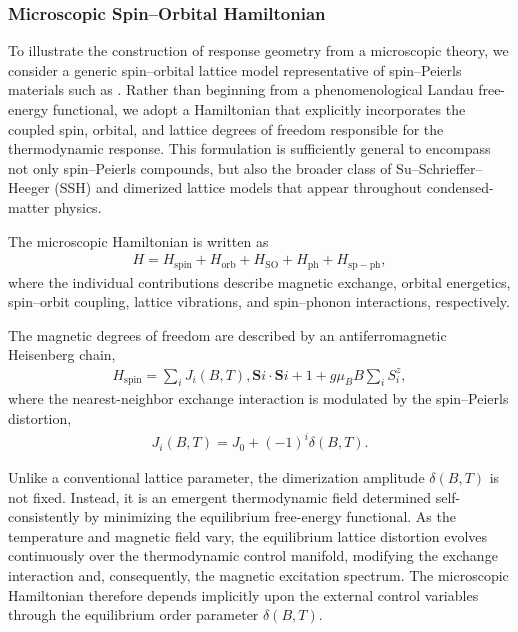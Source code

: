 \subsubsection{Microscopic Spin–Orbital Hamiltonian}

To illustrate the construction of response geometry from a
microscopic theory, we consider a generic spin–orbital lattice
model representative of spin–Peierls materials such as
. Rather than beginning from a phenomenological
Landau free-energy functional, we adopt a Hamiltonian that
explicitly incorporates the coupled spin, orbital, and lattice
degrees of freedom responsible for the thermodynamic response.
This formulation is sufficiently general to encompass not only
spin–Peierls compounds, but also the broader class of
Su–Schrieffer–Heeger (SSH) and dimerized lattice models that
appear throughout condensed-matter physics.

The microscopic Hamiltonian is written as
\begin{align}
H=H_{\mathrm{spin}}+H_{\mathrm{orb}}+H_{\mathrm{SO}}+H_{\mathrm{ph}}
+
H_{\mathrm{sp-ph}},
\end{align}
where the individual contributions describe magnetic exchange,
orbital energetics, spin–orbit coupling, lattice vibrations,
and spin–phonon interactions, respectively.

The magnetic degrees of freedom are described by an
antiferromagnetic Heisenberg chain,
\begin{align}
H_{\mathrm{spin}}
=
\sum_i
J_i(B,T),
\mathbf{S}i\cdot\mathbf{S}{i+1}
+
g\mu_BB
\sum_i
S_i^z,
\end{align}
where the nearest-neighbor exchange interaction is modulated by
the spin–Peierls distortion,
\begin{align}
J_i(B,T) =
J_0 + (-1)^i\delta(B,T).    
\end{align}

Unlike a conventional lattice parameter, the dimerization
amplitude \(\delta(B,T)\) is not fixed. Instead, it is an
emergent thermodynamic field determined self-consistently by
minimizing the equilibrium free-energy functional. As the
temperature and magnetic field vary, the equilibrium lattice
distortion evolves continuously over the thermodynamic control
manifold, modifying the exchange interaction and, consequently,
the magnetic excitation spectrum. The microscopic Hamiltonian
therefore depends implicitly upon the external control
variables through the equilibrium order parameter
\(\delta(B,T)\).


